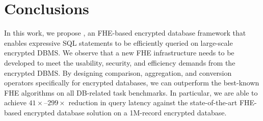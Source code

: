 \section{Conclusions}
In this work, we propose \NAME, an FHE-based encrypted database framework
that enables expressive SQL statements to be efficiently 
queried on large-scale encrypted DBMS. 
We observe that a new FHE infrastructure needs to be developed 
to meet the usability, security, and efficiency demands from
the encrypted DBMS. By designing comparison, aggregation, and
conversion operators specifically for encrypted databases, we can
outperform the best-known FHE algorithms on all DB-related task benchmarks.
In particular, we are able to achieve
$41\times$--$299\times$ reduction in query latency against the 
state-of-the-art FHE-based encrypted database solution
on a 1M-record encrypted database.

